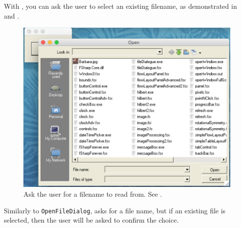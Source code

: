 \documentclass[fsharpnotes.tex]{subfiles}
\begin{document}
With , you can ask the user to select an existing filename, as demonstrated in  and .
%
%
\begin{figure}
  \centering
  \includegraphics[scale=0.5]{openFileDialog}
  \caption{Ask the user for a filename to read from. See .}
  \label{fig:openFileDialog}
\end{figure}
%
Similarly to \lstinline{OpenFileDialog},  asks for a file name, but if an existing file is selected, then the user will be asked to confirm the choice.
\clearpage
\end{document}
